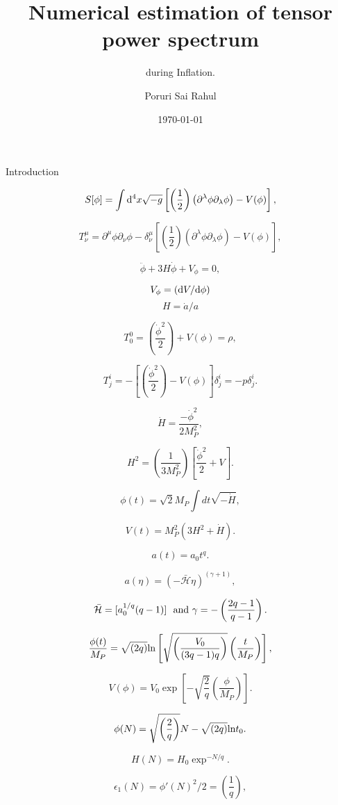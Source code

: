 \documentclass[xcolor=dvipsnames]{beamer}
\title[Mini Project]{Numerical estimation of tensor power spectrum}
\subtitle{during Inflation.}
\author{Poruri Sai Rahul}
\institute[IITM]{Department of Physics\\
IIT Madras}
\date[June 2015]{\today}
\begin{document}
\begin{frame}[plain,label=cover]
\titlepage
\end{frame}

\begin{frame}{Introduction}

\[ S[\phi] = \int {\rm d}^4x \sqrt{-g}\left[ \left(\frac{1}{2}\right)\left(\partial^{\lambda}\phi \partial_{\lambda}\phi\right) - V(\phi)\right], \]

\[ T^{\mu}_{\nu} = \partial^{\mu}\phi \partial_{\nu}\phi -\delta^{\mu}_{\nu}\left[\left(\frac{1}{2}\right)\left(\partial^{\lambda}\phi \partial_{\lambda}\phi\right) - V(\phi)\right], \]

\[ \ddot{\phi} + 3H\dot{\phi} + V_{\phi} = 0, \]

\[V_{\phi} = \left({\rm d}V/{\rm d}\phi\right)\] \[H = \dot{a}/a\]

\end{frame}

\begin{frame}

\[ T^{0}_{0} = \left(\frac{\dot{\phi}^2}{2}\right) +V(\phi) = \rho, \]

\[ T^{i}_{j} = -\left[\left(\frac{\dot{\phi}^2}{2}\right) - V(\phi)\right]\delta^{i}_{j} = -p\delta^i_j. \]

\[  \dot{H} = \frac{-\dot{\phi}^2}{2M_P^2}, \]

\[ H^2 = \left(\frac{1}{3M_P^2}\right)\left[\frac{\dot{\phi}^2}{2} + V\right]. \]

\[ \phi(t)= \sqrt{2}M_P \int dt \sqrt{-\dot{H}}, \]

\[ V(t) = M_P^2\left(3H^2 + \dot{H}\right). \]

\end{frame}

\begin{frame}

\[ a(t) = a_0t^q. \]

\[ a(\eta) = \left(-\mathcal{\bar{H}}\eta\right)^{\left(\gamma+1\right)}, \]

\[ \mathcal{\bar{H}} = [a_0^{1/q}(q-1)] ~{\rm ~and}~ \gamma  = -\left(\frac{2q-1}{q-1}\right). \]

\[ \frac{\phi(t)}{M_P} =\sqrt{\left(2q\right)} {\rm ln}\left[\sqrt{\left(\frac{V_0}{(3q-1)q}\right)}\left(\frac{t}{M_P}\right)\right], \]

\[ V(\phi) = V_0\exp\left[-\sqrt{\frac{2}{q}}\left(\frac{\phi}{M_P}\right)\right]. \]

\[ \phi(N) = \sqrt{\left(\frac{2}{q}\right)} N - \sqrt{\left(2q\right)}{\rm ln}t_0. \]

\[ H(N) = H_0\exp^{-N/q}. \]

\[  \epsilon_1(N) = \phi'(N)^2/2 = \left(\frac{1}{q}\right), \] 

\end{frame}
\end{document}
